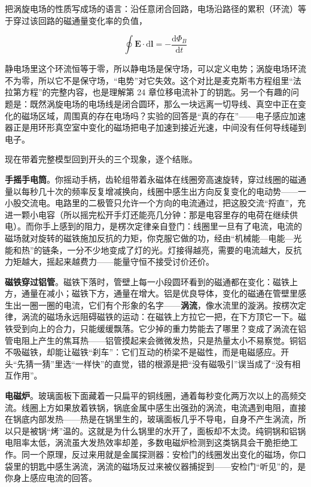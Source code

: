 \begin{challenge}
把涡旋电场的性质写成场的语言：沿任意闭合回路，电场沿路径的累积（环流）等于穿过该回路的磁通量变化率的负值，

\[
\oint\mathbf{E}\cdot\mathrm{d}\mathbf{l}=-\frac{\mathrm{d}\Phi_B}{\mathrm{d}t}
\]

静电场里这个环流恒等于零，所以静电场是保守场，可以定义电势；涡旋电场环流不为零，所以它不是保守场，“电势”对它失效。这个对比是麦克斯韦方程组里“法拉第方程”的完整内容，也是理解第 24 章位移电流补丁的钥匙。另一个有趣的问题是：既然涡旋电场的电场线是闭合圆环，那么一块远离一切导线、真空中正在变化的磁场区域，周围真的存在电场吗？实验的回答是“真的存在”——电子感应加速器正是用环形真空室中变化的磁场把电子加速到接近光速，中间没有任何导线碰到电子。
\end{challenge}


现在带着完整模型回到开头的三个现象，逐个结账。

\textbf{手摇手电筒}。你摇动手柄，齿轮组带着永磁体在线圈旁高速旋转，穿过线圈的磁通量以每秒几十次的频率反复增减换向，线圈中感生出方向反复变化的电动势——一小股交流电。电路里的二极管只允许一个方向的电流通过，把这股交流“捋直”，充进一颗小电容（所以摇完松开手灯还能亮几分钟：那是电容里存的电荷在继续供电）。而你手上感到的阻力，是楞次定律亲自登门：线圈里一旦有了电流，电流的磁场就对旋转的磁铁施加反抗的力矩，你克服它做的功，经由“机械能—电能—光能和热”的链条，一分不少地变成了灯的光。灯接得越亮，需要的电流越大，反抗力矩越大，摇起来越费力——能量守恒不接受讨价还价。

\textbf{磁铁穿过铝管}。磁铁下落时，管壁上每一小段圆环看到的磁通都在变化：磁铁上方，通量在减小；磁铁下方，通量在增大。铝是优良导体，变化的磁通在管壁里感生出一圈一圈的电流，它们有个形象的名字——\textbf{涡流}，像水流里的漩涡。按楞次定律，涡流的磁场永远阻碍磁铁的运动：在磁铁上方拉它一把，在下方顶它一下。磁铁受到向上的合力，只能缓缓飘落。它少掉的重力势能去了哪里？变成了涡流在铝管电阻上产生的焦耳热——铝管摸起来会微微发热，只是热量太小不易察觉。铜铝不吸磁铁，却能让磁铁“刹车”：它们互动的桥梁不是磁性，而是电磁感应。开头“先猜一猜”里选“一样快”的直觉，错的根源是把“没有磁吸引”误当成了“没有相互作用”。

\textbf{电磁炉}。玻璃面板下面藏着一只扁平的铜线圈，通着每秒变化两万次以上的高频交流。线圈上方如果放着铁锅，锅底金属中感生出强劲的涡流，电流遇到电阻，直接在锅底内部发热——热是在锅里生的，玻璃面板几乎不导电，自身不产生涡流，所以只是被锅“烤”温的。这就是为什么锅里的水开了，面板却不太烫。纯铜锅和铝锅电阻率太低，涡流虽大发热效率却差，多数电磁炉检测到这类锅具会干脆拒绝工作。同一个原理，反过来用就是金属探测器：安检门的线圈发出变化的磁场，你口袋里的钥匙中感生涡流，涡流的磁场反过来被仪器捕捉到——安检门“听见”的，是你身上感应电流的回答。

